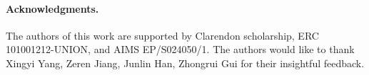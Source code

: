 %
\twocolumn[\maketitle\vspace{-2em}\bigbreak]








\paragraph*{Acknowledgments.}

The authors of this work are supported by Clarendon scholarship, ERC 101001212-UNION, and AIMS EP/S024050/1. The authors would like to thank Xingyi Yang, Zeren Jiang, Junlin Han, Zhongrui Gui for their insightful feedback.
